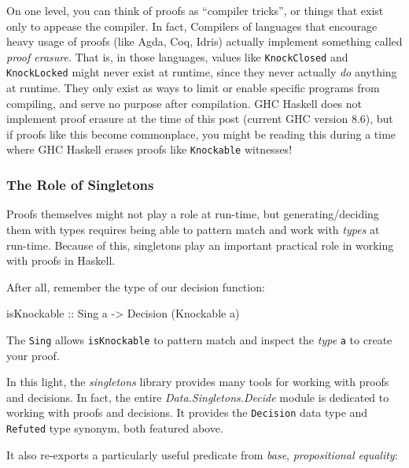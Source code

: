 \documentclass[]{article}
\newenvironment{Shaded}{}{}
\newcommand{\DataTypeTok}[1]{\textcolor[rgb]{0.56,0.13,0.00}{#1}}
\newcommand{\NormalTok}[1]{#1}
\newcommand{\OtherTok}[1]{\textcolor[rgb]{0.00,0.44,0.13}{#1}}
\begin{document}
On one level, you can think of proofs as ``compiler tricks'', or things that
exist only to appease the compiler. In fact, Compilers of languages that
encourage heavy usage of proofs (like Agda, Coq, Idris) actually implement
something called \emph{proof erasure}. That is, in those languages, values like
\texttt{KnockClosed} and \texttt{KnockLocked} might never exist at runtime,
since they never actually \emph{do} anything at runtime. They only exist as ways
to limit or enable specific programs from compiling, and serve no purpose after
compilation. GHC Haskell does not implement proof erasure at the time of this
post (current GHC version 8.6), but if proofs like this become commonplace, you
might be reading this during a time where GHC Haskell erases proofs like
\texttt{Knockable} witnesses!

\hypertarget{the-role-of-singletons}{%
\subsubsection{The Role of Singletons}\label{the-role-of-singletons}}

Proofs themselves might not play a role at run-time, but generating/deciding
them with types requires being able to pattern match and work with \emph{types}
at run-time. Because of this, singletons play an important practical role in
working with proofs in Haskell.

After all, remember the type of our decision function:

\begin{Shaded}
\begin{Highlighting}[]
\OtherTok{isKnockable ::} \DataTypeTok{Sing}\NormalTok{ a }\OtherTok{->} \DataTypeTok{Decision}\NormalTok{ (}\DataTypeTok{Knockable}\NormalTok{ a)}
\end{Highlighting}
\end{Shaded}

The \texttt{Sing} allows \texttt{isKnockable} to pattern match and inspect the
\emph{type} \texttt{a} to create your proof.

In this light, the \emph{singletons} library provides many tools for working
with proofs and decisions. In fact, the entire \emph{Data.Singletons.Decide}
module is dedicated to working with proofs and decisions. It provides the
\texttt{Decision} data type and \texttt{Refuted} type synonym, both featured
above.

It also re-exports a particularly useful predicate from \emph{base},
\emph{propositional equality}:
\end{document}
